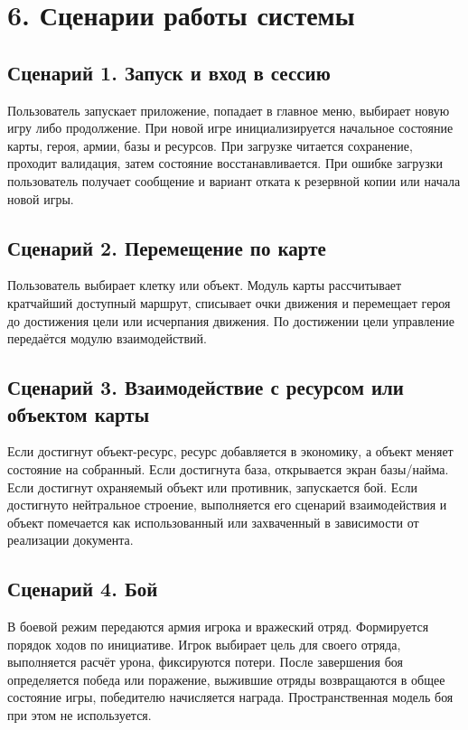 \documentclass[12pt,a4paper]{article}
\begin{document}
\section*{6. Сценарии работы системы}

\subsection*{Сценарий 1. Запуск и вход в сессию}

Пользователь запускает приложение, попадает в главное меню, выбирает новую игру либо продолжение. При новой игре инициализируется начальное состояние карты, героя, армии, базы и ресурсов. При загрузке читается сохранение, проходит валидация, затем состояние восстанавливается. При ошибке загрузки пользователь получает сообщение и вариант отката к резервной копии или начала новой игры.

\subsection*{Сценарий 2. Перемещение по карте}

Пользователь выбирает клетку или объект. Модуль карты рассчитывает кратчайший доступный маршрут, списывает очки движения и перемещает героя до достижения цели или исчерпания движения. По достижении цели управление передаётся модулю взаимодействий.

\subsection*{Сценарий 3. Взаимодействие с ресурсом или объектом карты}

Если достигнут объект-ресурс, ресурс добавляется в экономику, а объект меняет состояние на собранный. Если достигнута база, открывается экран базы/найма. Если достигнут охраняемый объект или противник, запускается бой. Если достигнуто нейтральное строение, выполняется его сценарий взаимодействия и объект помечается как использованный или захваченный в зависимости от реализации документа.

\subsection*{Сценарий 4. Бой}

В боевой режим передаются армия игрока и вражеский отряд. Формируется порядок ходов по инициативе. Игрок выбирает цель для своего отряда, выполняется расчёт урона, фиксируются потери. После завершения боя определяется победа или поражение, выжившие отряды возвращаются в общее состояние игры, победителю начисляется награда. Пространственная модель боя при этом не используется.
\end{document}
